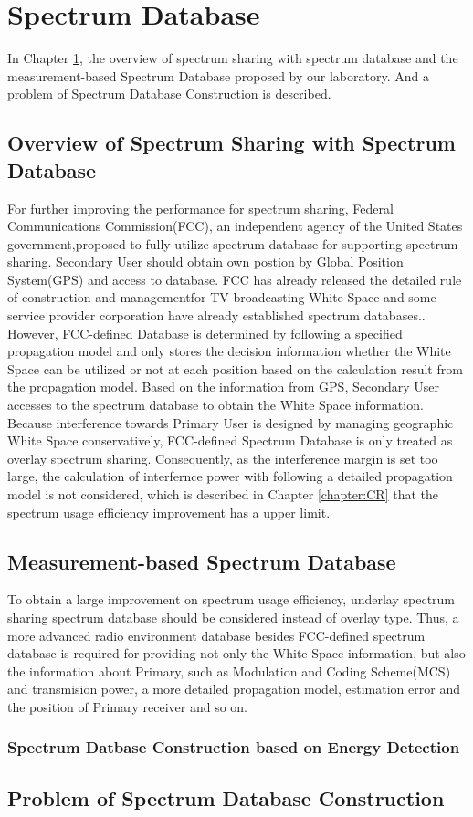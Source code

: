 \chapter[Spectrum Database]{Spectrum Database}
\label{chapter:Database}
In Chapter \ref{chapter:Database}, the overview of spectrum sharing with spectrum database and the measurement-based Spectrum Database proposed by our laboratory. And a problem of Spectrum Database Construction is described.

\section{Overview of Spectrum Sharing with Spectrum Database}
For further improving the performance for spectrum sharing, Federal Communications Commission(FCC), an independent agency of the United States government,proposed to fully utilize spectrum database for supporting spectrum sharing. Secondary User should obtain own postion by Global Position System(GPS) and access to database. FCC has already released the detailed rule of construction and managementfor TV broadcasting White Space and some service provider corporation have already established spectrum databases.\cite{ref:fcc,ref:google,ref:microsoft}. However, FCC-defined Database is determined by following a specified propagation model and only stores the decision information whether the White Space can be utilized or not at each position based on the calculation result from the propagation model. Based on the information from GPS, Secondary User accesses to the spectrum database to obtain the White Space information. Because interference towards Primary User is designed by managing geographic White Space conservatively, FCC-defined Spectrum Database is only treated as overlay spectrum sharing. Consequently, as the interference margin is set too large, the calculation of interfernce power with following a detailed propagation model is not considered, which is described in Chapter \ref{chapter:CR} that the spectrum usage efficiency improvement has a upper limit.


\section{Measurement-based Spectrum Database}
To obtain a large improvement on spectrum usage efficiency, underlay spectrum sharing spectrum database should be considered instead of overlay type. Thus, a more advanced radio environment database besides FCC-defined spectrum database is required for providing not only the White Space information, but also the information about Primary, such as Modulation and Coding Scheme(MCS) and transmision power, a more detailed propagation model, estimation error and the position of Primary receiver and so on.

    \subsection{Spectrum Datbase Construction based on Energy Detection}

\section{Problem of Spectrum Database Construction }

